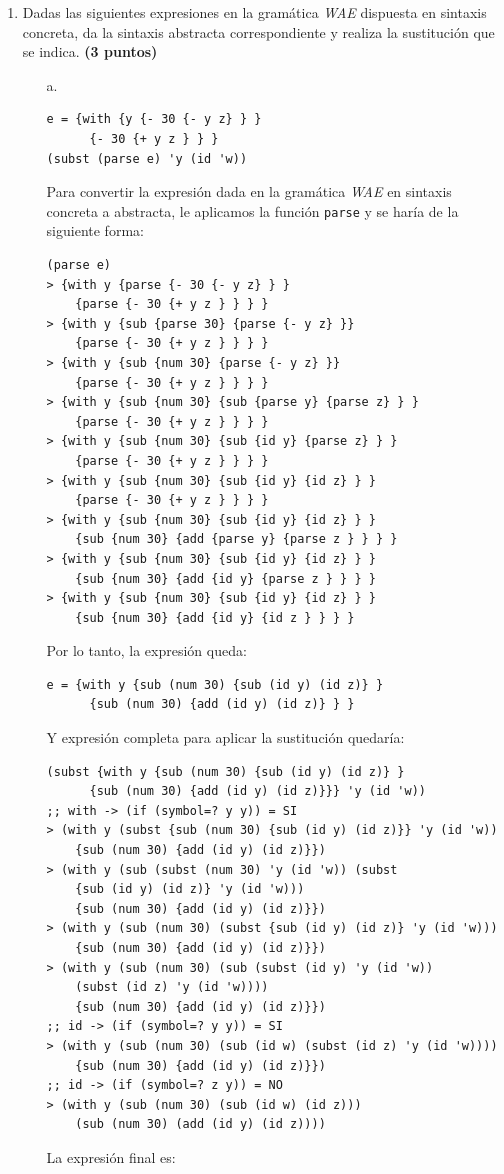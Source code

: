 \documentclass[11pt]{article}
\begin{document}
\begin{enumerate}[leftmargin=0.8cm]
    \item Dadas las siguientes expresiones en la gramática \textit{WAE} dispuesta en sintaxis concreta, da la sintaxis abstracta correspondiente y realiza la sustitución que se indica. \textbf{(3 puntos)}
    \begin{enumerate}
        \item[a.] \begin{lstlisting}
e = {with {y {- 30 {- y z} } }
      {- 30 {+ y z } } }
(subst (parse e) 'y (id 'w))
        \end{lstlisting}
        Para convertir la expresión dada en la gramática \textit{WAE} en sintaxis concreta a abstracta, le aplicamos la función \texttt{parse} y se haría de la siguiente forma:
        \begin{lstlisting}
(parse e)
> {with y {parse {- 30 {- y z} } }
    {parse {- 30 {+ y z } } } }
> {with y {sub {parse 30} {parse {- y z} }}
    {parse {- 30 {+ y z } } } }
> {with y {sub {num 30} {parse {- y z} }}
    {parse {- 30 {+ y z } } } }
> {with y {sub {num 30} {sub {parse y} {parse z} } }
    {parse {- 30 {+ y z } } } }
> {with y {sub {num 30} {sub {id y} {parse z} } }
    {parse {- 30 {+ y z } } } }
> {with y {sub {num 30} {sub {id y} {id z} } }
    {parse {- 30 {+ y z } } } }
> {with y {sub {num 30} {sub {id y} {id z} } }
    {sub {num 30} {add {parse y} {parse z } } } }
> {with y {sub {num 30} {sub {id y} {id z} } }
    {sub {num 30} {add {id y} {parse z } } } }
> {with y {sub {num 30} {sub {id y} {id z} } }
    {sub {num 30} {add {id y} {id z } } } }
        \end{lstlisting}
        Por lo tanto, la expresión queda:
        \begin{lstlisting}
e = {with y {sub (num 30) {sub (id y) (id z)} } 
      {sub (num 30) {add (id y) (id z)} } }
        \end{lstlisting}
        Y expresión completa para aplicar la sustitución quedaría:
        \begin{lstlisting}
(subst {with y {sub (num 30) {sub (id y) (id z)} }
      {sub (num 30) {add (id y) (id z)}}} 'y (id 'w))
;; with -> (if (symbol=? y y)) = SI
> (with y (subst {sub (num 30) {sub (id y) (id z)}} 'y (id 'w))
    {sub (num 30) {add (id y) (id z)}})
> (with y (sub (subst (num 30) 'y (id 'w)) (subst 
    {sub (id y) (id z)} 'y (id 'w)))
    {sub (num 30) {add (id y) (id z)}})
> (with y (sub (num 30) (subst {sub (id y) (id z)} 'y (id 'w)))
    {sub (num 30) {add (id y) (id z)}})
> (with y (sub (num 30) (sub (subst (id y) 'y (id 'w)) 
    (subst (id z) 'y (id 'w))))
    {sub (num 30) {add (id y) (id z)}})
;; id -> (if (symbol=? y y)) = SI
> (with y (sub (num 30) (sub (id w) (subst (id z) 'y (id 'w))))
    {sub (num 30) {add (id y) (id z)}})
;; id -> (if (symbol=? z y)) = NO
> (with y (sub (num 30) (sub (id w) (id z)))
    (sub (num 30) (add (id y) (id z))))
        \end{lstlisting}
        La expresión final es:\\


\end{enumerate}
\end{enumerate}
\end{document}
